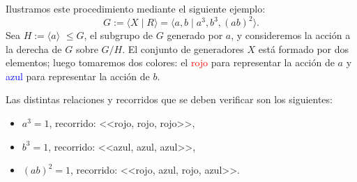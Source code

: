 \iffalse
El procedimiento a seguir es el siguiente:
\begin{enumerate}
    \item Se construirán tantas tablas como relaciones definan al grupo. En cada tabla de relator, deben aparecer todos los generadores en la cabecera, ya que por hipótesis, el grupo es finito.
    
    \item El primer valor de cada fila hace referencia a cada clase de $G/H$. El $1$ representa la clase $H\in G/H$.
    
    \item Tomamos el primer generador del grupo, por ejemplo, $a$. Si $aH=H$, entonces $1:=1^a$, en caso contrario, se tomará una nueva clase y se definirá $2:=1^a$.
\end{enumerate}
\fi



























Ilustramos este procedimiento mediante el siguiente ejemplo:
\[
    G := \langle X \mid R \rangle  =\langle a,b \mid  a^3, b^3, (ab)^2 \rangle .
\]
Sea $H:=\langle a \rangle $ $\leq G$, el subgrupo de $G$ generado por $a$, y consideremos la acción a la derecha de $G$ sobre $G/H$. El conjunto de generadores $X$ está formado por dos elementos; luego tomaremos dos colores: el \textcolor{red}{rojo} para representar la acción de $a$ y \textcolor{blue}{azul} para representar la acción de $b$.


Las distintas relaciones y recorridos que se deben verificar son los siguientes:
\begin{itemize}
    \item $a^3=1$, recorrido: <<rojo, rojo, rojo>>,
    \item $b^3=1$, recorrido:  <<azul, azul, azul>>,
    \item $(ab)^2=1$, recorrido:  <<rojo, azul, rojo, azul>>.
\end{itemize}


